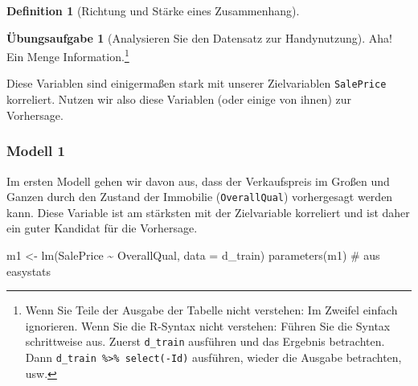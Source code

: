 \documentclass[
  a4paper,
  DIV=11]{scrreprt}
\newenvironment{Shaded}{\begin{snugshade}}{\end{snugshade}}
\newcommand{\AttributeTok}[1]{\textcolor[rgb]{0.40,0.45,0.13}{#1}}
\newcommand{\CommentTok}[1]{\textcolor[rgb]{0.37,0.37,0.37}{#1}}
\newcommand{\DecValTok}[1]{\textcolor[rgb]{0.68,0.00,0.00}{#1}}
\newcommand{\FunctionTok}[1]{\textcolor[rgb]{0.28,0.35,0.67}{#1}}
\newcommand{\NormalTok}[1]{\textcolor[rgb]{0.00,0.23,0.31}{#1}}
\newcommand{\OtherTok}[1]{\textcolor[rgb]{0.00,0.23,0.31}{#1}}
\newcommand{\SpecialCharTok}[1]{\textcolor[rgb]{0.37,0.37,0.37}{#1}}
\newcommand{\StringTok}[1]{\textcolor[rgb]{0.13,0.47,0.30}{#1}}
\theoremstyle{definition}
\newtheorem{exercise}{Übungsaufgabe}[chapter]
\theoremstyle{definition}
\theoremstyle{definition}
\newtheorem{definition}{Definition}[chapter]
\theoremstyle{remark}
\begin{document}
\begin{definition}[Richtung und Stärke eines
Zusammenhang]
\begin{exercise}[Analysieren Sie den Datensatz zur
Handynutzung]
%

Aha! Ein Menge Information.\footnote{Wenn Sie Teile der Ausgabe der
  Tabelle nicht verstehen: Im Zweifel einfach ignorieren. Wenn Sie die
  R-Syntax nicht verstehen: Führen Sie die Syntax schrittweise aus.
  Zuerst \texttt{d\_train} ausführen und das Ergebnis betrachten. Dann
  \texttt{d\_train\ \%\textgreater{}\%\ select(-Id)} ausführen, wieder
  die Ausgabe betrachten, usw.}

Diese Variablen sind einigermaßen stark mit unserer Zielvariablen
\texttt{SalePrice} korreliert. Nutzen wir also diese Variablen (oder
einige von ihnen) zur Vorhersage.

\subsubsection{Modell 1}\label{modell-1}

Im ersten Modell gehen wir davon aus, dass der Verkaufspreis im Großen
und Ganzen durch den Zustand der Immobilie (\texttt{OverallQual})
vorhergesagt werden kann. Diese Variable ist am stärksten mit der
Zielvariable korreliert und ist daher ein guter Kandidat für die
Vorhersage.

\begin{Shaded}
\begin{Highlighting}[]
\NormalTok{m1 }\OtherTok{\textless{}{-}} \FunctionTok{lm}\NormalTok{(SalePrice }\SpecialCharTok{\textasciitilde{}}\NormalTok{ OverallQual, }\AttributeTok{data =}\NormalTok{ d\_train)}
\FunctionTok{parameters}\NormalTok{(m1)  }\CommentTok{\# aus easystats}
\end{Highlighting}
\end{Shaded}


\end{exercise}
\end{definition}
\end{document}

